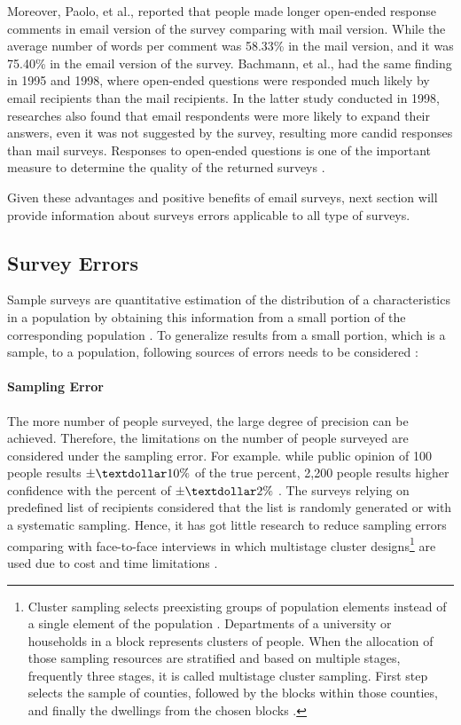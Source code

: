 Moreover, Paolo, et al., \citep{Paolo2009} reported that people made longer open-ended response comments in email version of the survey comparing with mail version. While the average number of words per comment was 58.33\% in the mail version, and it was 75.40\% in the email version of the survey. Bachmann, et al., \citep{BachmannD.ElfrinkJ.&Vazzana1999} had the same finding in 1995 and 1998, where open-ended questions were responded much likely by email recipients than the mail recipients. In the latter study conducted in 1998, researches also found that email respondents were more likely to expand their answers, even it was not suggested by the survey, resulting more candid responses than mail surveys. Responses to open-ended questions is one of the important measure to determine the quality of the returned surveys \citep{BachmannD.ElfrinkJ.&Vazzana1999}.
\vspace{1cm}

Given these advantages and positive benefits of email surveys, next section will provide information about surveys errors applicable to all type of surveys.

\subsection{Survey Errors}
\label{sec:2.1.2:SurErr}
Sample surveys are quantitative estimation of the distribution of a characteristics in a population by obtaining this information from a small portion of the corresponding population \citep{Dillman1991}. To generalize results from a small portion, which is a sample, to a population, following sources of errors needs to be considered \citep[page 9]{Dillman2006} \citep{Dillman1991}:

\paragraph{Sampling Error}
The more number of people surveyed, the large degree of precision can be achieved. Therefore, the limitations on the number of people surveyed are considered under the sampling error. For example. while public opinion of 100 people results \(\pm\textdollar10\%\) of the true percent, 2,200 people results higher confidence with the percent of \(\pm\textdollar2\%\) \citep[page 9]{Dillman2006}. The surveys relying on predefined list of recipients considered that the list is randomly generated or with a systematic sampling. Hence, it has got little research to reduce sampling errors comparing with face-to-face interviews in which multistage cluster designs\footnote{Cluster sampling selects preexisting groups of population elements instead of a single element of the population \citep[page 106]{Groves2009}. Departments of a university or households in a block represents clusters of people. When the allocation of those sampling resources are stratified and based on multiple stages, frequently three stages, it is called multistage cluster sampling. First step selects the sample of counties, followed by the blocks within those counties, and finally the dwellings from the chosen blocks \citep{Scott1969}.} are used due to cost and time limitations \citep[page 106]{Groves2009} \citep{Dillman1991}.

